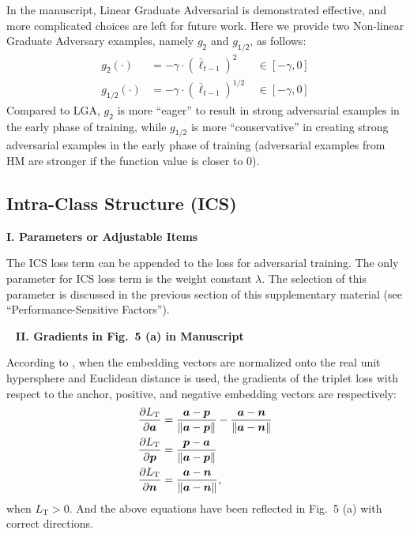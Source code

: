 In the manuscript, Linear Graduate Adversarial is demonstrated effective,
and more complicated choices are left for future work.
%
Here we provide two Non-linear Graduate Adversary examples, namely
$g_\mathsf{2}$ and $g_\mathsf{1/2}$, as follows:
%
\begin{align}
	g_\mathsf{2}(\cdot)   &= -\gamma \cdot (\bar{\ell}_{t-1})^{2}  &~ \in [-\gamma,0]\\
	g_\mathsf{1/2}(\cdot) &= -\gamma \cdot (\bar{\ell}_{t-1})^{1/2} &~ \in [-\gamma, 0]
\end{align}
%
Compared to LGA, $g_\mathsf{2}$ is more ``eager'' to result in strong adversarial
examples in the early phase of training, while $g_\mathsf{1/2}$ is more ``conservative''
in creating strong adversarial examples in the early phase of training
(adversarial examples from HM are stronger if the function value is closer to $0$).


\subsection{Intra-Class Structure (ICS)}

\noindent\textbf{I. Parameters or Adjustable Items}

The ICS loss term can be appended to the loss for adversarial training.
%
The only parameter for ICS loss term is the weight constant $\lambda$.
%
The selection of this parameter is discussed in the previous section of this
supplementary material (see ``Performance-Sensitive Factors'').

~\newline
\noindent\textbf{II. Gradients in Fig.~5 (a) in Manuscript}

According to \cite{robrank}, when the embedding vectors are normalized onto the
real unit hypersphere and Euclidean distance is used, the gradients of the
triplet loss with respect to the anchor, positive, and negative embedding
vectors are respectively:
%
\begin{align}
%
	\frac{\partial L_\text{T}}{\partial \va} &= \frac{\va - \vp}{\|\va - \vp\|}
	- \frac{\va - \vn}{\| \va - \vn \|} \\
	\frac{\partial L_\text{T}}{\partial \vp} &= \frac{\vp - \va}{\|\va - \vp\|} \\
	\frac{\partial L_\text{T}}{\partial \vn} &= \frac{\va - \vn}{\|\va - \vn\|},
%
\end{align}
%
when $L_\text{T}>0$.
And the above equations have been reflected in Fig.~5 (a) with correct directions.

